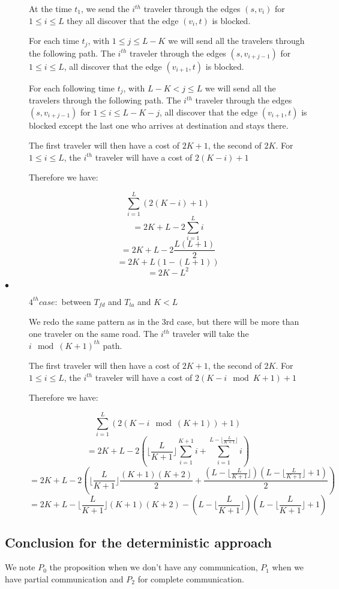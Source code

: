\documentclass[a4paper, 10pt]{article}
\begin{document}
\begin{description}
At the time $t_1$, we send the $i^{th}$ traveler through the edges $(s,v_i)$ for $1 \leq i \leq L$ they all discover that the edge $(v_i,t)$ is blocked.

For each time $t_j$, with $1 \leq j \leq L-K$ we will send all the travelers through the following path. The $i^{th}$ traveler through the edges $(s,v_{i+j-1})$ for $1 \leq i \leq L$, all discover that the edge $(v_{i+1},t)$ is blocked.

For each following time $t_j$, with $L-K < j \leq L$ we will send all the travelers through the following path. The $i^{th}$ traveler through the edges $(s,v_{i+j-1})$ for $1 \leq i \leq L-K-j$, all discover that the edge $(v_{i+1},t)$ is blocked except the last one who arrives at destination and stays there.

The first traveler will then have a cost of $2K+1$, the second of $2K$. For $1 \leq i \leq L$, the $i^{th}$ traveler will have a cost of $2(K-i)+1$

Therefore we have:

\[
\sum_{i=1}^{L}(2(K-i)+1)
\]
\[
= 2K + L - 2\sum_{i=1}^{L}i
\]
\[
= 2K + L - 2\frac{L(L+1)}{2}
\]
\[
= 2K + L(1-(L+1))
\]
\[
= 2K - L^2
\]

\item[$\bullet$] $4^{th} case:$ between $T_{fd}$ and $T_{la}$ and $K<L$

We redo the same pattern as in the 3rd case, but there will be more than one traveler on the same road. The $i^{th}$ traveler will take the $i\mod{(K+1)}^{th}$ path.

The first traveler will then have a cost of $2K+1$, the second of $2K$. For $1 \leq i \leq L$, the $i^{th}$ traveler will have a cost of $2(K-i\mod{K+1})+1$

Therefore we have:

\[
\sum_{i=1}^{L}(2(K-i\mod{(K+1)})+1)
\]
\[
= 2K + L - 2\left(\lfloor \frac{L}{K+1} \rfloor \sum_{i=1}^{K+1}i + \sum_{i=1}^{L-\lfloor \frac{L}{K+1} \rfloor}i\right)
\]
\[
= 2K + L - 2\left(\lfloor \frac{L}{K+1} \rfloor\frac{(K+1)(K+2)}{2} + \frac{(L-\lfloor \frac{L}{K+1} \rfloor)(L-\lfloor \frac{L}{K+1} \rfloor + 1)}{2}\right)
\]
\[
= 2K + L - \lfloor \frac{L}{K+1} \rfloor(K+1)(K+2) - (L-\lfloor \frac{L}{K+1} \rfloor)(L-\lfloor \frac{L}{K+1} \rfloor + 1)
\]

\end{description}

\subsection{Conclusion for the deterministic approach}
We note $P_0$ the proposition when we don't have any communication, $P_1$ when we have partial communication and $P_2$ for complete communication.
\end{document}
